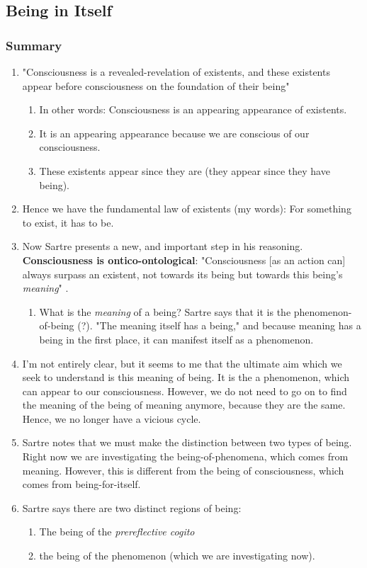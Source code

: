 \begin{enumerate}
\end{enumerate}
\subsection{Being in Itself}
\subsubsection*{Summary}

\begin{enumerate}
  \item "Consciousness is a revealed-revelation of existents, and these existents appear before consciousness on the foundation of their being" \autocite[24]{sartre}
  \begin{enumerate}
    \item In other words: Consciousness is an appearing appearance of existents.
    \item It is an appearing appearance because we are conscious of our consciousness.
    \item These existents appear since they are (they appear since they have being).
  \end{enumerate}
  \item Hence we have the fundamental law of existents (my words): For something to exist, it has to be.
  \item Now Sartre presents a new, and important step in his reasoning. \textbf{Consciousness is ontico-ontological}: "Consciousness [as an action can] always surpass an existent, not towards its being but towards this being's \emph{meaning}" \autocite[24]{sartre}.
  \begin{enumerate}
    \item What is the \emph{meaning} of a being? Sartre says that it is the phenomenon-of-being (?). "The meaning itself has a being," and because meaning has a being in the first place, it can manifest itself as a phenomenon.
  \end{enumerate}
  \item I'm not entirely clear, but it seems to me that the ultimate aim which we seek to understand is this meaning of being. It is the a phenomenon, which can appear to our consciousness. However, we do not need to go on to find the meaning of the being of meaning anymore, because they are the same. Hence, we no longer have a vicious cycle.
  \item Sartre notes that we must make the distinction between two types of being. Right now we are investigating the being-of-phenomena, which comes from meaning. However, this is different from the being of consciousness, which comes from being-for-itself.
  \item Sartre says there are two distinct regions of being:
  \begin{enumerate}
    \item The being of the \emph{prereflective cogito}
    \item the being of the phenomenon (which we are investigating now).
  \end{enumerate}
\end{enumerate}

